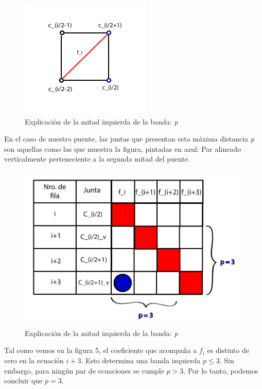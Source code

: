\begin{figure}[!h]
	\begin{center}
		  \includegraphics[scale=1.5]{Imagenes/im_4.pdf}
		  \caption{Explicación de la mitad izquierda de la banda: \emph{p}}
		  \label{fig:contra1}
	\end{center}
\end{figure}
\FloatBarrier

En el caso de nuestro puente, las juntas que presentan esta máxima distancia \emph{p} son aquellas como las que muestra la 
figura, pintadas en azul: Par alineado verticalmente perteneciente a la segunda mitad del puente.  

\begin{figure}[!h]
	\begin{center}
		  \includegraphics[scale=0.5]{Imagenes/im_5.pdf}
		  \caption{Explicación de la mitad izquierda de la banda: \emph{p}}
		  \label{fig:contra1}
	\end{center}
\end{figure}
\FloatBarrier

Tal como vemos en la figura 5, el coeficiente que acompaña a $f_{i}$ es distinto de cero en la ecuación $i+3$. Esto determina
una banda izquierda $p \leq 3$. Sin embargo, para ningún par de ecuaciones se cumple $p > 3$. Por lo tanto, podemos concluir que $p=3$.

